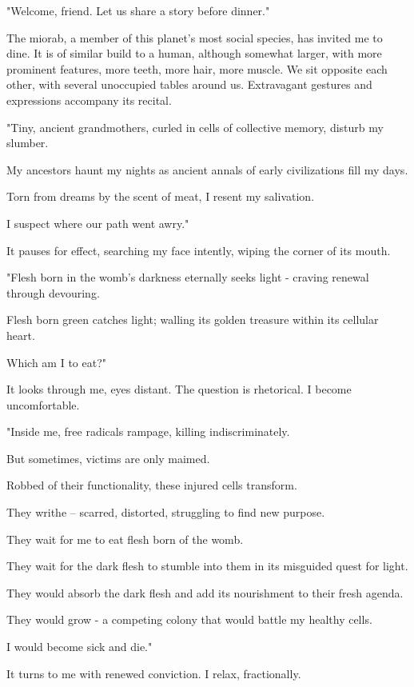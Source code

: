 
"Welcome, friend. Let us share a story before dinner."

The miorab, a member of this planet's most social species, has invited
me to dine. It is of similar build to a human, although somewhat larger,
with more prominent features, more teeth, more hair, more muscle. We sit
opposite each other, with several unoccupied tables around us.
Extravagant gestures and expressions accompany its recital.

"Tiny, ancient grandmothers, curled in cells of collective memory,
disturb my slumber.

My ancestors haunt my nights as ancient annals of early civilizations
fill my days.

Torn from dreams by the scent of meat, I resent my salivation.

I suspect where our path went awry."

It pauses for effect, searching my face intently, wiping the corner of
its mouth.

"Flesh born in the womb's darkness eternally seeks light - craving
renewal through devouring.

Flesh born green catches light; walling its golden treasure within its
cellular heart.

Which am I to eat?"

It looks through me, eyes distant. The question is rhetorical. I become
uncomfortable.

"Inside me, free radicals rampage, killing indiscriminately.

But sometimes, victims are only maimed.

Robbed of their functionality, these injured cells transform.

They writhe -- scarred, distorted, struggling to find new purpose.

They wait for me to eat flesh born of the womb.

They wait for the dark flesh to stumble into them in its misguided quest
for light.

They would absorb the dark flesh and add its nourishment to their fresh
agenda.

They would grow - a competing colony that would battle my healthy cells.

I would become sick and die."

It turns to me with renewed conviction. I relax, fractionally.

